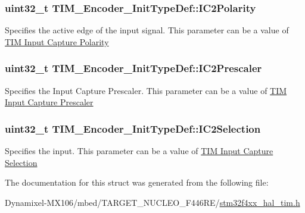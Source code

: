 \subsubsection[{\texorpdfstring{I\+C2\+Polarity}{IC2Polarity}}]{\setlength{\rightskip}{0pt plus 5cm}uint32\+\_\+t T\+I\+M\+\_\+\+Encoder\+\_\+\+Init\+Type\+Def\+::\+I\+C2\+Polarity}\hypertarget{struct_t_i_m___encoder___init_type_def_abb7968a8ba34e13da1fb8f5916a754ce}{}\label{struct_t_i_m___encoder___init_type_def_abb7968a8ba34e13da1fb8f5916a754ce}
Specifies the active edge of the input signal. This parameter can be a value of \hyperlink{group___t_i_m___input___capture___polarity}{T\+IM Input Capture Polarity} 
\subsubsection[{\texorpdfstring{I\+C2\+Prescaler}{IC2Prescaler}}]{\setlength{\rightskip}{0pt plus 5cm}uint32\+\_\+t T\+I\+M\+\_\+\+Encoder\+\_\+\+Init\+Type\+Def\+::\+I\+C2\+Prescaler}\hypertarget{struct_t_i_m___encoder___init_type_def_ac80972d0e157508ff075815da58070cb}{}\label{struct_t_i_m___encoder___init_type_def_ac80972d0e157508ff075815da58070cb}
Specifies the Input Capture Prescaler. This parameter can be a value of \hyperlink{group___t_i_m___input___capture___prescaler}{T\+IM Input Capture Prescaler} 
\subsubsection[{\texorpdfstring{I\+C2\+Selection}{IC2Selection}}]{\setlength{\rightskip}{0pt plus 5cm}uint32\+\_\+t T\+I\+M\+\_\+\+Encoder\+\_\+\+Init\+Type\+Def\+::\+I\+C2\+Selection}\hypertarget{struct_t_i_m___encoder___init_type_def_a84a39a8667f296b4b3fbe1a0add58396}{}\label{struct_t_i_m___encoder___init_type_def_a84a39a8667f296b4b3fbe1a0add58396}
Specifies the input. This parameter can be a value of \hyperlink{group___t_i_m___input___capture___selection}{T\+IM Input Capture Selection} 

The documentation for this struct was generated from the following file\+:\begin{DoxyCompactItemize}
\item 
Dynamixel-\/\+M\+X106/mbed/\+T\+A\+R\+G\+E\+T\+\_\+\+N\+U\+C\+L\+E\+O\+\_\+\+F446\+R\+E/\hyperlink{stm32f4xx__hal__tim_8h}{stm32f4xx\+\_\+hal\+\_\+tim.\+h}\end{DoxyCompactItemize}
